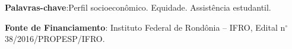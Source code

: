\documentclass[article,12pt,onesidea,4paper,english,brazil]{abntex2}
\begin{document}
	\vspace{\onelineskip}
	
	\noindent
	\textbf{Palavras-chave}:Perfil socioeconômico. Equidade. Assistência estudantil.
	
	\noindent
	\textbf{Fonte de Financiamento}: Instituto Federal de Rondônia – IFRO, Edital n$^{\circ}$
	38/2016/PROPESP/IFRO.
	
\end{document}
